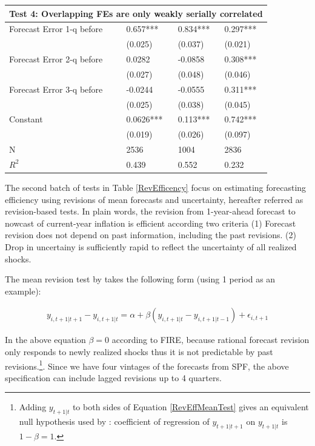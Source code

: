 \documentclass[]{article}
\begin{document}
\begin{table}[ht]
\begin{tabular}{llll}
	\hline 
	\multicolumn{4}{l}{Test 4: Overlapping FEs are only weakly serially correlated}                          \\
	\hline 
	Forecast Error 1-q before           & 0.657***         & 0.834***         & 0.297***       \\
	& (0.025)          & (0.037)          & (0.021)        \\
	Forecast Error 2-q before           & 0.0282           & -0.0858          & 0.308***       \\
	& (0.027)          & (0.048)          & (0.046)        \\
	Forecast Error 3-q before           & -0.0244          & -0.0555          & 0.311***       \\
	& (0.025)          & (0.038)          & (0.045)        \\
	Constant                            & 0.0626***        & 0.113***         & 0.742***       \\
	& (0.019)          & (0.026)          & (0.097)        \\
	\hline 
	N                                   & 2536             & 1004             & 2836           \\
	$R^2$                & 0.439            & 0.552            & 0.232    \\
	\hline      
\end{tabular}
\end{table}

The second batch of tests in Table \ref{RevEfficency} focus on estimating forecasting efficiency using revisions of mean forecasts and uncertainty, hereafter referred as revision-based tests.  In plain words, the revision from 1-year-ahead forecast to nowcast of current-year inflation is efficient according two criteria (1) Forecast revision does not depend on past information, including the past revisions. (2) Drop in uncertainy is sufficiently rapid to reflect the uncertainty of all realized shocks. 

The mean revision test by \citet{fuhrer2018intrinsic} takes the following form (using 1 period as an example): 

\begin{eqnarray}\label{RevEffMeanTest}
y_{i,t+1|t+1} - y_{i,t+1|t}=\alpha + \beta (y_{i,t+1|t} - y_{i,t+1|t-1})+\epsilon_{i,t+1}
\end{eqnarray}

In the above equation $\beta =0$ according to FIRE, because rational forecast revision only responds to newly realized shocks thus it is not predictable by past revisions.\footnote{Adding $y_{t+1|t}$ to both sides of Equation \ref{RevEffMeanTest} gives an equivalent null hypothesis used by \citet{fuhrer2018intrinsic}: coefficient of regression of $y_{t+1|t+1}$ on  $y_{t+1|t}$ is $1-\beta=1$. }. Since we have four vintages of the forecasts from SPF, the above specification can include lagged revisions up to 4 quarters.  
\end{document}
